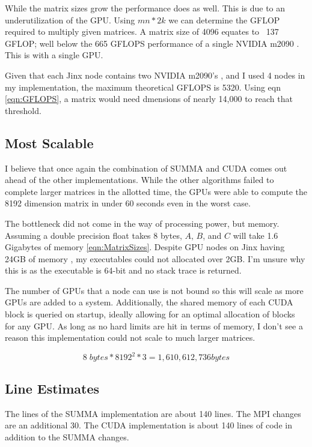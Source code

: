 \documentclass[11pt, twocolumn]{article}
\begin{document}
While the matrix sizes grow the performance does as well. This is due to an underutilization of the GPU. Using $mn*2k$ we can determine the GFLOP required to multiply given matrices. A matrix size of 4096 equates to ~137 GFLOP; well below the 665 GFLOPS performance of a single NVIDIA m2090 \cite{TECH_SPEC}. This is with a single GPU. 

Given that each Jinx node contains two NVIDIA m2090's \cite{JINX_INFO}, and I used 4 nodes in my implementation, the maximum theoretical GFLOPS is 5320. Using eqn \ref{eqn:GFLOPS}, a matrix would need dmensions of nearly 14,000 to reach that threshold.

\subsection{Most Scalable}
I believe that once again the combination of SUMMA and CUDA comes out ahead of the other implementations. While the other algorithms failed to complete larger matrices in the allotted time, the GPUs were able to compute the 8192 dimension matrix in under 60 seconds even in the worst case.

The bottleneck did not come in the way of processing power, but memory. Assuming a double precision float takes 8 bytes, $A$, $B$, and $C$ will take 1.6 Gigabytes of memory \ref{eqn:MatrixSizes}. Despite GPU nodes on Jinx having 24GB of memory \cite{JINX_INFO}, my executables could not allocated over 2GB. I'm unsure why this is as the executable is 64-bit and no stack trace is returned.

The number of GPUs that a node can use is not bound so this will scale as more GPUs are added to a system. Additionally, the shared memory of each CUDA block is queried on startup, ideally allowing for an optimal allocation of blocks for any GPU. As long as no hard limits are hit in terms of memory, I don't see a reason this implementation could not scale to much larger matrices.

\begin{equation}\label{eqn:MatrixSizes}
8\; bytes * 8192^2 * 3= 1,610,612,736 bytes
\end{equation}

\subsection{Line Estimates}
The lines of the SUMMA implementation are about 140 lines. The MPI changes are an additional 30. The CUDA implementation is about 140 lines of code in addition to the SUMMA changes.
\end{document}
